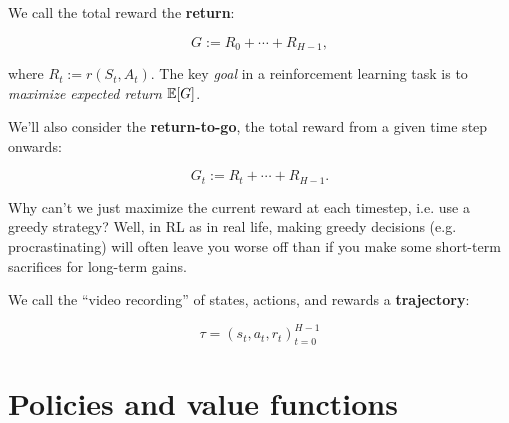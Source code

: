 \documentclass[../main/main]{subfiles}
\begin{document}


We call the total reward the \textbf{return}:

\[
    G := R_0 + \cdots + R_{H-1},
\]

where $R_t := r(S_t, A_t)$. The key \emph{goal} in a reinforcement learning task is to \emph{maximize expected return} $\operatorname*{\mathbb{E}}[G]$.

We'll also consider the \textbf{return-to-go}, the total reward from a given time step onwards:

\[
    G_t := R_t + \cdots + R_{H-1}.
\]








Why can't we just maximize the current reward at each timestep, i.e. use a greedy strategy? Well, in RL as in real life, making greedy decisions (e.g. procrastinating) will often leave you worse off than if you make some short-term sacrifices for long-term gains.

We call the ``video recording'' of states, actions, and rewards a \textbf{trajectory}:

\[
    \tau = (s_t, a_t, r_t)_{t=0}^{H-1}
\]


\section{Policies and value functions}
\end{document}
